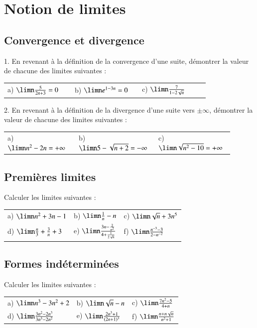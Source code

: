 \documentclass[oneside,12pt]{article}          %
\begin{document}
\section{Notion de limites}

\subsection{Convergence et divergence}
1. En revenant à la définition de la convergence d'une suite, démontrer la valeur de chacune des limites suivantes :

\begin{tabular}{p{0.3\linewidth}p{0.3\linewidth}p{0.3\linewidth}}
	a) $\limn\frac{5}{2n+3}=0$ & b) $\limn e^{1-3n}=0$ & c) $\limn \frac{7}{1-2\sqrt{n}}$
\end{tabular}

2. En revenant à la définition de la divergence d'une suite vers $\pm \infty$, démontrer la valeur de chacune des limites suivantes :

\begin{tabular}{p{0.3\linewidth}p{0.3\linewidth}p{0.3\linewidth}}
	a) $\limn n^2-2n=+\infty$ & b) $\limn 5-\sqrt{n+2}=-\infty$ & c) $\limn \sqrt{n^2-10}=+\infty$
\end{tabular}



\subsection{Premières limites}
Calculer les limites suivantes :

\renewcommand{\arraystretch}{1.5}
\begin{tabular}{p{} p{} p{}}
    a) $\limn n^2+3n-1$ & b) $\limn \frac{1}{n}-n$ & c) $\limn \sqrt{n}+3n^5$\\
    d) $\limn \frac{n}{3}+\frac{3}{n}+3$ & e) $\limn \frac{3n-\frac{2}{n^2}}{4+\frac{1}{2\sqrt{n}}}$ & f) $\limn \frac{n^{-3}-3}{2-n^{-2}}$
\end{tabular}



\subsection{Formes indéterminées}
Calculer les limites suivantes :

\renewcommand{\arraystretch}{1.5}
\begin{tabular}{p{} p{} p{}}
    a) $\limn n^3-3n^2+2$ & b) $\limn \sqrt{n}-n$ & c) $\limn \frac{7n^2-5}{4+n}$\\
    d) $\limn \frac{3n^2-2n^3}{3n^3-2n^2}$ & e) $\limn \frac{2n^3+1}{(2n+1)^3}$ & f) $\limn \frac{n+n\sqrt{n}}{n^2+1}$
\end{tabular}
\end{document}
